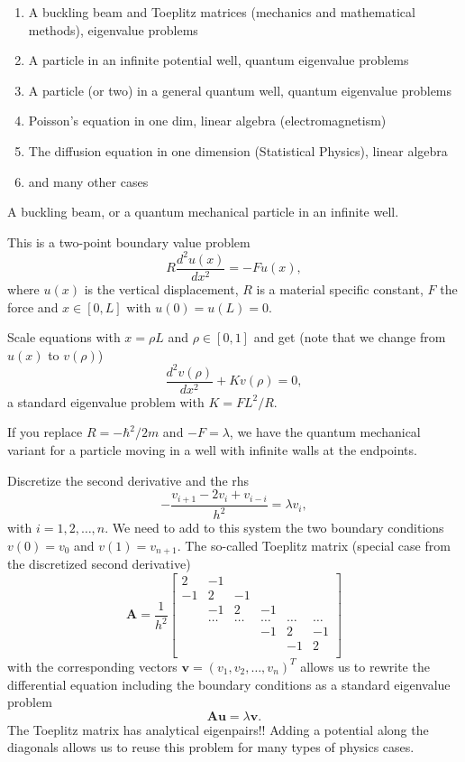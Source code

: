 \documentclass[graybox,envcountchap,sectrefs]{svmult}
\begin{document}
\begin{enumerate}
\item A buckling beam and Toeplitz matrices (mechanics and mathematical methods), eigenvalue problems

\item A particle in an infinite potential well, quantum eigenvalue problems

\item A particle (or two) in a general quantum well, quantum eigenvalue problems

\item Poisson's  equation in one dim, linear algebra (electromagnetism)

\item The diffusion equation in one dimension (Statistical Physics), linear algebra

\item and many other cases
\end{enumerate}

\noindent
A buckling beam, or a quantum mechanical particle in an infinite well. 

This is a two-point boundary value problem
\[
R \frac{d^2 u(x)}{dx^2} = -F u(x),
\]
where $u(x)$ is the vertical displacement, $R$ is a material specific constant, $F$ the force and $x \in [0,L]$ with $u(0)=u(L)=0$.

Scale equations with $x = \rho L$ and $\rho \in [0,1]$ and get (note that we change from $u(x)$ to $v(\rho)$) 
\[
\frac{d^2 v(\rho)}{dx^2} +K v(\rho)=0,
\]
a standard eigenvalue problem with $K= FL^2/R$.

If you replace $R=-\hbar^2/2m$ and $-F=\lambda$, we have the quantum mechanical variant for a particle moving in a well with infinite walls at the endpoints.

Discretize the second derivative and the rhs
\[
    -\frac{v_{i+1} -2v_i +v_{i-i}}{h^2}=\lambda v_i,
\]
with $i=1,2,\dots, n$. We need to add to this system the two boundary conditions $v(0) =v_0$ and $v(1) = v_{n+1}$.
The so-called Toeplitz matrix (special case from the discretized second derivative)
\[
    \mathbf{A} = \frac{1}{h^2}\begin{bmatrix}
                          2 & -1 &  &   &  & \\
                          -1 & 2 & -1 & & & \\
                           & -1 & 2 & -1 & &  \\
                           & \dots   & \dots &\dots   &\dots & \dots \\
                           &   &  &-1  &2& -1 \\
                           &    &  &   &-1 & 2 \\
                      \end{bmatrix}
\]
with the corresponding vectors $\mathbf{v} = (v_1, v_2, \dots,v_n)^T$ allows us to rewrite the differential equation
including the boundary conditions as a standard eigenvalue problem
\[
   \mathbf{A}\mathbf{u} = \lambda\mathbf{v}.
\]
The Toeplitz matrix has analytical eigenpairs!! Adding a potential along the diagonals allows us to reuse this problem for many types of physics cases.
\end{document}
